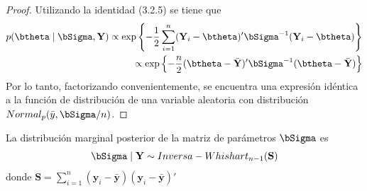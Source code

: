 \begin{proof}
Utilizando la identidad (3.2.5) se tiene que
\begin{align*}
p(\btheta \mid \bSigma,\mathbf{Y}) \propto \exp\left\{ -\frac{1}{2}\sum_{i=1}^n (\mathbf{Y}_i-\btheta)'\bSigma^{-1}(\mathbf{Y}_i-\btheta)\right\}\\
\propto \exp\left\{ -\frac{n}{2}(\btheta-\bar{\mathbf{Y}})'\bSigma^{-1}(\btheta-\bar{\mathbf{Y}})\right\}
\end{align*}
Por lo tanto, factorizando convenientemente, se encuentra una expresión idéntica a la función de distribución de una variable aleatoria con distribución $Normal_p(\bar{y},\bSigma/n)$.
\end{proof}
  
\begin{Res}
La distribución marginal posterior de la matriz de parámetros $\bSigma$ es
\begin{equation*}
\bSigma \mid \mathbf{Y}\sim Inversa-Whishart_{n-1}(\mathbf{S})
\end{equation*}
donde $\mathbf{S}=\sum_{i=1}^n(\mathbf{y}_i-\bar{\mathbf{y}})(\mathbf{y}_i-\bar{\mathbf{y}})'$
\end{Res}

